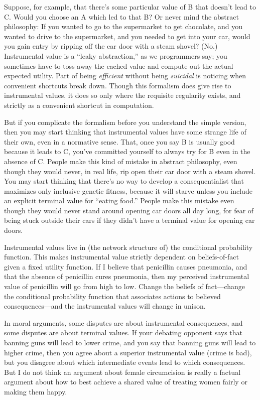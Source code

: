 {
 Suppose, for example, that there's some particular
value of B that doesn't lead to C. Would you choose an
A which led to that B? Or never mind the abstract philosophy: If you
wanted to go to the supermarket to get chocolate, and you wanted to
drive to the supermarket, and you needed to get into your car, would
you gain entry by ripping off the car door with a steam shovel? (No.)
Instrumental value is a ``leaky
abstraction,'' as we programmers say; you sometimes
have to toss away the cached value and compute out the actual expected
utility. Part of being \textit{efficient} without being
\textit{suicidal} is noticing when convenient shortcuts break down.
Though this formalism does give rise to instrumental values, it does so
only where the requisite regularity exists, and strictly as a
convenient shortcut in computation.}

{
 But if you complicate the formalism before you understand the
simple version, then you may start thinking that instrumental values
have some strange life of their own, even in a normative sense. That,
once you say B is usually good because it leads to C,
you've committed yourself to always try for B even in
the absence of C. People make this kind of mistake in abstract
philosophy, even though they would never, in real life, rip open their
car door with a steam shovel. You may start thinking that
there's no way to develop a consequentialist that
maximizes only inclusive genetic fitness, because it will starve unless
you include an explicit terminal value for ``eating
food.'' People make this mistake even though they
would never stand around opening car doors all day long, for fear of
being stuck outside their cars if they didn't have a
terminal value for opening car doors.}

{
 Instrumental values live in (the network structure of) the
conditional probability function. This makes instrumental value
strictly dependent on beliefs-of-fact given a fixed utility function.
If I believe that penicillin causes pneumonia, and that the absence of
penicillin cures pneumonia, then my perceived instrumental value of
penicillin will go from high to low. Change the beliefs of
fact---change the conditional probability function that associates
actions to believed consequences---and the instrumental values will
change in unison.}

{
 In moral arguments, some disputes are about instrumental
consequences, and some disputes are about terminal values. If your
debating opponent says that banning guns will lead to lower crime, and
you say that banning guns will lead to higher crime, then you agree
about a superior instrumental value (crime is bad), but you disagree
about which intermediate events lead to which consequences. But I do
not think an argument about female circumcision is really a factual
argument about how to best achieve a shared value of treating women
fairly or making them happy.}

